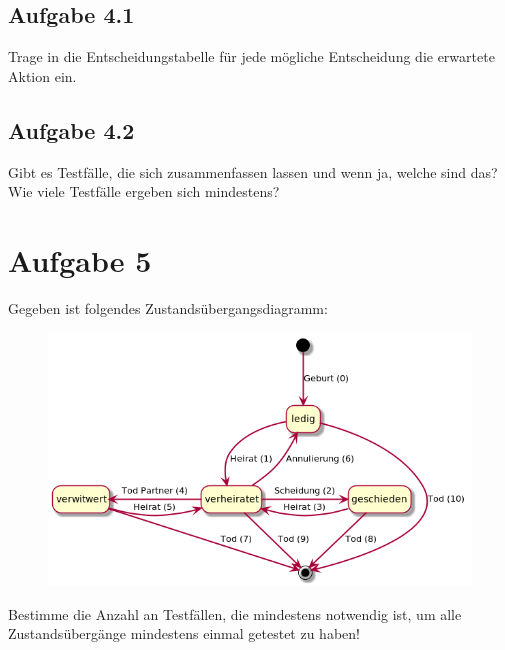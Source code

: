 \subsection*{Aufgabe 4.1}
Trage in die Entscheidungstabelle für jede mögliche Entscheidung die erwartete Aktion ein.

\subsection*{Aufgabe 4.2}
Gibt es Testfälle, die sich zusammenfassen lassen und wenn ja, welche sind das? Wie viele Testfälle ergeben sich mindestens?

\newpage
\section*{Aufgabe 5}

Gegeben ist folgendes Zustandsübergangsdiagramm:

\begin{center}
\begin{figure}[ht]
  \centering
  \includegraphics[width=\textwidth]{Uebungen/beziehungen.png}
\end{figure}
\end{center}

Bestimme die Anzahl an Testfällen, die mindestens notwendig ist, um alle Zustandsübergänge mindestens einmal getestet zu haben!

